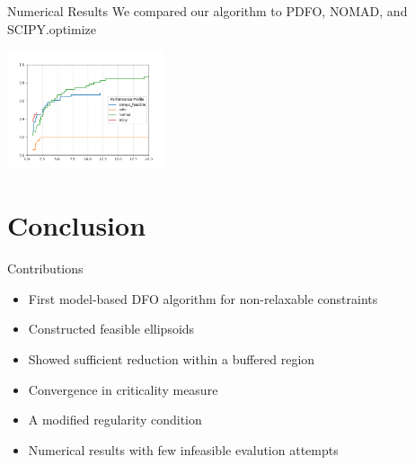 \documentclass{beamer}
\begin{document}
\begin{frame}{Numerical Results}
	We compared our algorithm to PDFO, NOMAD, and SCIPY.optimize
	\begin{center}
		\includegraphics[width=175px]{images/nonlinear_performance_profile.png}
	\end{center}
\end{frame}




\section{Conclusion}

\begin{frame}{Contributions}
	\begin{itemize}
		\setlength\itemsep{1.5em}
		\item First model-based DFO algorithm for non-relaxable constraints
		\item Constructed feasible ellipsoids
		\item Showed sufficient reduction within a buffered region
		\item Convergence in criticality measure
		\item A modified regularity condition
		\item Numerical results with few infeasible evalution attempts
	\end{itemize}
\end{frame}


\end{document}
